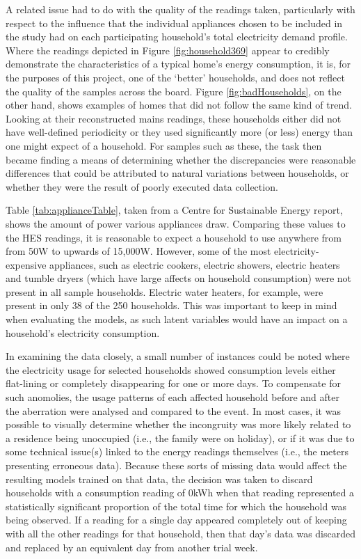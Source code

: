 A related issue had to do with the quality of the readings taken, particularly with respect to the influence that the individual appliances chosen to be included in the study had on each participating household's total electricity demand profile. Where the readings depicted in Figure \ref{fig:household369} appear to credibly demonstrate the characteristics of a typical home's energy consumption, it is, for the purposes of this project, one of the `better' households, and does not reflect the quality of the samples across the board.  Figure \ref{fig:badHouseholds}, on the other hand, shows examples of homes that did not follow the same kind of trend. Looking at their reconstructed mains readings, these households either did not have well-defined periodicity or they used significantly more (or less) energy than one might expect of a household.  For samples such as these, the task then became finding a means of determining whether the discrepancies were reasonable differences that could be attributed to natural variations between households, or whether they were the result of poorly executed data collection. 

\badHouseholds

Table \ref{tab:applianceTable}, taken from a Centre for Sustainable Energy \cite{CSE} report, shows the amount of power various appliances draw. Comparing these values to the HES readings, it is reasonable to expect a household to use anywhere from from 50W to upwards of 15,000W.  However, some of the most electricity-expensive appliances, such as electric cookers, electric showers, electric heaters and tumble dryers (which have large affects on household consumption) were not present in all sample households. Electric water heaters, for example, were present in only 38 of the 250 households. This was important to keep in mind when evaluating the models, as such latent variables would have an impact on a household's electricity consumption.

\applianceTable


In examining the data closely, a small number of instances could be noted where the electricity usage for selected households showed consumption levels either flat-lining or completely disappearing for one or more days.  To compensate for such anomolies, the usage patterns of each affected household before and after the aberration were analysed and compared to the event.  In most cases, it was possible to visually determine whether the incongruity was more likely related to a residence being unoccupied (i.e., the family were on holiday), or if it was due to some technical issue(s) linked to the energy readings themselves (i.e., the meters presenting erroneous data). Because these sorts of missing data would affect the resulting models trained on that data, the decision was taken to discard households with a consumption reading of 0kWh when that reading represented a statistically significant proportion of the total time for which the household was being observed.  If a reading for a single day appeared completely out of keeping with all the other readings for that household, then that day's data was discarded and replaced by an equivalent day from another trial week.

